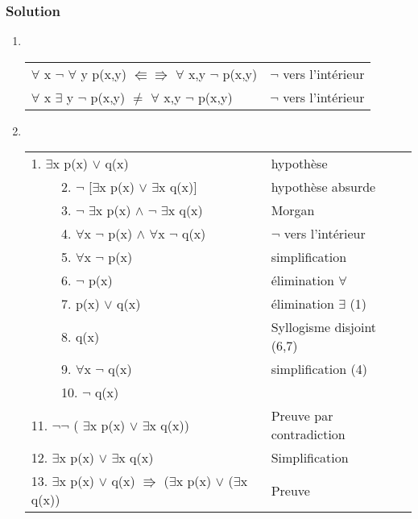     \subsubsection*{Solution}
  \begin{enumerate}

    \item \hspace{1pt}\\
        \begin{tabular}{|l|l|}
        \hline
        $\forall$ x $\neg$ $\forall$ y p(x,y) $\Lleftarrow \Rrightarrow$ $\forall$ x,y $\neg$ p(x,y) & $\neg$ vers l'intérieur\\
        $\forall$ x $\exists$ y $\neg$ p(x,y) $\ne$ $\forall$ x,y $\neg$ p(x,y)& $\neg$ vers l'intérieur\\
        \hline
        \end{tabular}

    \item \hspace{1pt}\\
        \begin{tabular}{|l|l|}
        \hline
        1. $\exists$x p(x) $\lor$ q(x) & hypothèse \\
        $\qquad$ 2. $\neg$ [$\exists$x p(x) $\lor$ $\exists$x q(x)] & hypothèse absurde\\
        $\qquad$ 3. $\neg$ $\exists$x p(x) $\land$ $\neg$ $\exists$x q(x) & Morgan\\
        $\qquad$ 4. $\forall$x $\neg$ p(x) $\land$ $\forall$x $\neg$ q(x) & $\neg$ vers l'intérieur\\
        $\qquad$ 5. $\forall$x $\neg$ p(x) & simplification\\
        $\qquad$ 6. $\neg$ p(x) & élimination $\forall$\\
        $\qquad$ 7. p(x) $\lor$ q(x) & élimination $\exists$ (1)\\
        $\qquad$ 8. q(x) & Syllogisme disjoint (6,7)\\
        $\qquad$ 9. $\forall$x $\neg$ q(x) & simplification (4)\\
        $\qquad$ 10. $\neg$ q(x) & \\
        11. $\neg \neg$ ( $\exists$x p(x) $\lor$ $\exists$x q(x)) & Preuve par contradiction\\
        12. $\exists$x p(x) $\lor$ $\exists$x q(x)& Simplification\\
        13. $\exists$x p(x) $\lor$ q(x) $\Rrightarrow$ ($\exists$x p(x) $\lor$ ($\exists$x q(x)) & Preuve\\
        \hline
        \end{tabular}


\end{enumerate}
